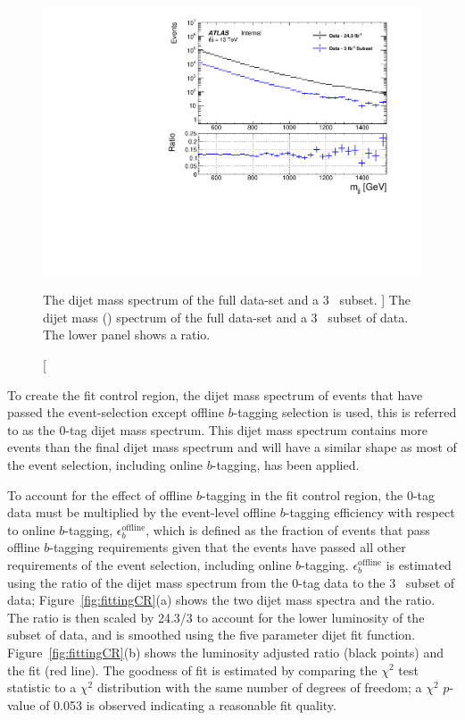 \begin{figure}[!htb]
\captionsetup[subfigure]{aboveskip=0pt,justification=centering}
\centering
\includegraphics[width=0.7\linewidth, angle=0]{figs/Dibjet/LowMass/FitStudy/subset_dataComp.pdf}
\vspace{-1em}
\caption
    [ The dijet mass spectrum of the full \lm{} data-set and a 3~\ifb{} subset.
      ]
    {\label{fig:fittingDataSubset}
      The dijet mass (\mjj{}) spectrum of the full \lm{} data-set and a 3~\ifb{} subset of \lm{} data.
      The lower panel shows a ratio.}
    \vspace{-1em}
\end{figure}

To create the \lm{} fit control region,
the dijet mass spectrum of events that have passed the
\lm{} event-selection except offline $b$-tagging selection is used,
this is referred to as the 0-tag dijet mass spectrum.
This dijet mass spectrum contains more events than the final dijet mass spectrum
and will have a similar shape as most of the event selection, including online $b$-tagging, has been applied.

To account for the effect of offline $b$-tagging in the fit control region,
the 0-tag data must be multiplied by the event-level offline $b$-tagging efficiency with respect to online $b$-tagging, $\epsilon_b^{\text{offline}}$,
which is defined as the fraction of events that pass offline $b$-tagging requirements given
that the events have passed all other requirements of the \lm{} event selection, including online $b$-tagging.
$\epsilon_b^{\text{offline}}$ is estimated using the ratio
of the dijet mass spectrum from the 0-tag data to the 3~\ifb{} subset of data;
Figure~\ref{fig:fittingCR}(a) shows the two dijet mass spectra and the ratio.
The ratio is then scaled by 24.3/3 to account for the lower luminosity of the subset of data,
and is smoothed using the five parameter dijet fit function.
Figure~\ref{fig:fittingCR}(b) shows the luminosity adjusted ratio (black points) and the fit (red line).
The goodness of fit is estimated by comparing the $\chi^2$ test statistic to a $\chi^2$ distribution with the same number of degrees of freedom;
a $\chi^2$ $p$-value of 0.053 is observed indicating a reasonable fit quality.

